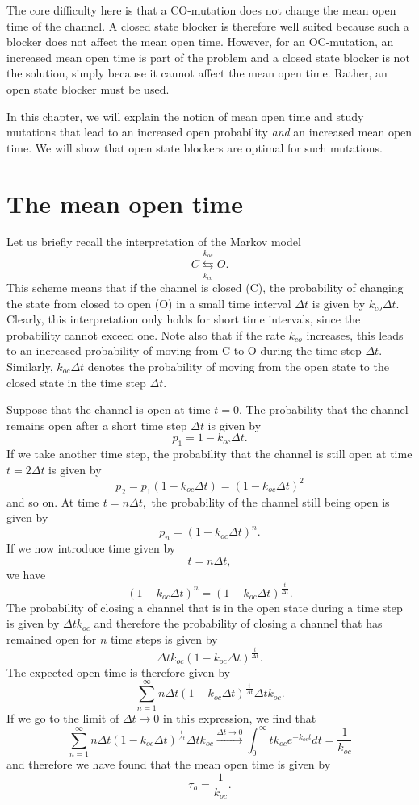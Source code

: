 The core difficulty here is that a CO-mutation does not
change the mean open time of the channel. A closed state blocker is therefore
well suited because such a blocker does not affect the mean open time. 
However, for an OC-mutation,
an increased mean open time is part of the problem and a closed state blocker
is not the solution, simply because it cannot affect the mean open time. Rather, an open state blocker must be used.

In this chapter, we will explain the notion of mean open time and study
mutations that lead to an increased open probability \textit{and} an increased mean
open time. We will show that open state blockers are optimal for such mutations.

\section{The mean open time}

Let us briefly recall the interpretation of the Markov model
\[
C\underset{k_{co}}{\overset{k_{oc}}{\leftrightarrows}}O.
\]
This scheme means that if the channel is closed (C), the probability of
changing the state from closed to open (O) in a small time interval $\Delta t$ is
given by $k_{co}\Delta t.$ Clearly, this interpretation only holds for short
time intervals, since the probability cannot exceed one. Note also that if the
rate $k_{co}$ increases, this leads to an increased probability of moving from C
to O during the time step $\Delta t.$ Similarly, $k_{oc}\Delta t$ denotes the
probability of moving from the open state to the closed state in the time step
$\Delta t.$

Suppose that the channel is open at time $t=0.$ The probability that the
channel remains open after a short time step $\Delta t$ is given by
\[
p_{1}=1-k_{oc}\Delta t.
\]
If we take another time step, the probability that the channel is still open
at time $t=2\Delta t$ is given by
\[
p_{2}=p_{1}\left(  1-k_{oc}\Delta t\right)  =\left(  1-k_{oc}\Delta t\right)
^{2}
\]
and so on. At time $t=n\Delta t,$ the probability of the channel still being
open is given by
\[
p_{n}=\left(  1-k_{oc}\Delta t\right)  ^{n}.
\]
If we now introduce time given by
\[
t=n\Delta t,
\]
we have
\[
\left(  1-k_{oc}\Delta t\right)  ^{n}=\left(  1-k_{oc}\Delta t\right)
^{\frac{t}{\Delta t}}.
\]
The probability of closing a channel that is in the open state during a
time step is given by $\Delta tk_{oc}$ and therefore the probability of
closing a channel that has remained open for $n$ time steps is given by
\[
\Delta tk_{oc}\left(  1-k_{oc}\Delta t\right)  ^{\frac{t}{\Delta t}}.
\]
The expected open time is therefore given by
\[
\sum_{n=1}^{\infty}n\Delta t\left(  1-k_{oc}\Delta t\right)  ^{\frac{t}{\Delta
t}}\Delta tk_{oc}.
\]
If we go to the limit of $\Delta t\rightarrow0$ in this expression, we find
that
\[
\sum_{n=1}^{\infty}n\Delta t\left(  1-k_{oc}\Delta t\right)  ^{\frac{t}{\Delta
t}}\Delta tk_{oc}\overset{\Delta t\rightarrow0}{\longrightarrow}\int
_{0}^{\infty}tk_{oc}e^{-k_{oc}t}dt=\frac{1}{k_{oc}}
\]
and therefore we have found that the mean open time is given by
\begin{equation}
\tau_{o}=\frac{1}{k_{oc}}. \label{tau_o}
\end{equation}


